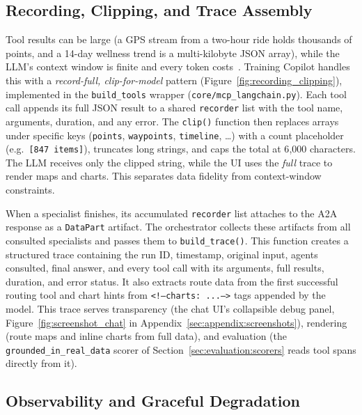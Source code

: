 \subsection{Recording, Clipping, and Trace Assembly}\label{sec:agents:recording}

Tool results can be large (a GPS stream from a two-hour ride holds thousands of points, and a 14-day wellness trend is a multi-kilobyte JSON array), while the LLM's context window is finite and every token costs~\citep{qu_tool_2024}. Training Copilot handles this with a \textit{record-full, clip-for-model} pattern (Figure~\ref{fig:recording_clipping}), implemented in the \texttt{build\_tools} wrapper (\texttt{core/mcp\_langchain.py}). Each tool call appends its full JSON result to a shared \texttt{recorder} list with the tool name, arguments, duration, and any error. The \texttt{clip()} function then replaces arrays under specific keys (\texttt{points}, \texttt{waypoints}, \texttt{timeline}, \ldots) with a count placeholder (e.g.\ \texttt{[847 items]}), truncates long strings, and caps the total at 6{,}000 characters. The LLM receives only the clipped string, while the UI uses the \textit{full} trace to render maps and charts. This separates data fidelity from context-window constraints.



When a specialist finishes, its accumulated \texttt{recorder} list attaches to the A2A response as a \texttt{DataPart} artifact. The orchestrator collects these artifacts from all consulted specialists and passes them to \texttt{build\_trace()}. This function creates a structured trace containing the run ID, timestamp, original input, agents consulted, final answer, and every tool call with its arguments, full results, duration, and error status. It also extracts route data from the first successful routing tool and chart hints from \texttt{<!--charts: ...-->} tags appended by the model. This trace serves transparency (the chat UI's collapsible debug panel, Figure~\ref{fig:screenshot_chat} in Appendix~\ref{sec:appendix:screenshots}), rendering (route maps and inline charts from full data), and evaluation (the \texttt{grounded\_in\_real\_data} scorer of Section~\ref{sec:evaluation:scorers} reads tool spans directly from it).

\subsection{Observability and Graceful Degradation}\label{sec:agents:observability}

